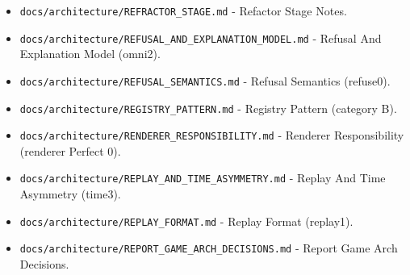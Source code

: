 \documentclass[9pt,a4paper,openany]{book}
\begin{document}
\begin{itemize}
\item \texttt{docs/\allowbreak{}architecture/\allowbreak{}REFRACTOR\_\allowbreak{}STAGE.\allowbreak{}md} -\allowbreak{} Refactor Stage Notes.\allowbreak{}
\end{itemize}

\begin{itemize}
\item \texttt{docs/\allowbreak{}architecture/\allowbreak{}REFUSAL\_\allowbreak{}AND\_\allowbreak{}EXPLANATION\_\allowbreak{}MODEL.\allowbreak{}md} -\allowbreak{} Refusal And Explanation Model (omni2).\allowbreak{}
\end{itemize}

\begin{itemize}
\item \texttt{docs/\allowbreak{}architecture/\allowbreak{}REFUSAL\_\allowbreak{}SEMANTICS.\allowbreak{}md} -\allowbreak{} Refusal Semantics (refuse0).\allowbreak{}
\end{itemize}

\begin{itemize}
\item \texttt{docs/\allowbreak{}architecture/\allowbreak{}REGISTRY\_\allowbreak{}PATTERN.\allowbreak{}md} -\allowbreak{} Registry Pattern (category B).\allowbreak{}
\end{itemize}

\begin{itemize}
\item \texttt{docs/\allowbreak{}architecture/\allowbreak{}RENDERER\_\allowbreak{}RESPONSIBILITY.\allowbreak{}md} -\allowbreak{} Renderer Responsibility (renderer Perfect 0).\allowbreak{}
\end{itemize}

\begin{itemize}
\item \texttt{docs/\allowbreak{}architecture/\allowbreak{}REPLAY\_\allowbreak{}AND\_\allowbreak{}TIME\_\allowbreak{}ASYMMETRY.\allowbreak{}md} -\allowbreak{} Replay And Time Asymmetry (time3).\allowbreak{}
\end{itemize}

\begin{itemize}
\item \texttt{docs/\allowbreak{}architecture/\allowbreak{}REPLAY\_\allowbreak{}FORMAT.\allowbreak{}md} -\allowbreak{} Replay Format (replay1).\allowbreak{}
\end{itemize}

\begin{itemize}
\item \texttt{docs/\allowbreak{}architecture/\allowbreak{}REPORT\_\allowbreak{}GAME\_\allowbreak{}ARCH\_\allowbreak{}DECISIONS.\allowbreak{}md} -\allowbreak{} Report Game Arch Decisions.\allowbreak{}
\end{itemize}
\end{document}
